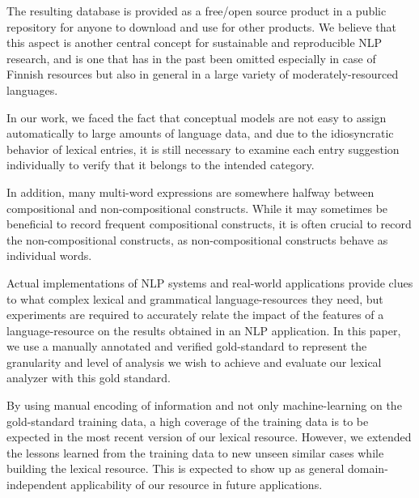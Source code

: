 \documentclass[11pt]{article}
\begin{document}
The resulting database is provided as a free/open source product in a public
repository for anyone to download and use for other products. We believe that
this aspect is another central concept for sustainable and reproducible NLP
research, and is one that has in the past been omitted especially in case of
Finnish resources but also in general in a large variety of
moderately-resourced languages.

In our work, we faced the fact that conceptual models are not easy to assign
automatically to large amounts of language data, and due to the idiosyncratic
behavior of lexical entries, it is still necessary to examine each entry
suggestion individually to verify that it belongs to the intended category.

In addition, many multi-word expressions are somewhere halfway between
compositional and non-compositional constructs.  While it may sometimes be
beneficial to record frequent compositional constructs, it is often crucial to
record the non-compositional constructs, as non-compositional constructs behave
as individual words. 

Actual implementations of NLP systems and real-world applications provide clues
to what complex lexical and grammatical language-resources they need, but
experiments are required to accurately relate the impact of the features of a
language-resource on the results obtained in an NLP application.  In this
paper, we use a manually annotated and verified gold-standard to represent the
granularity and level of analysis we wish to achieve and evaluate our lexical
analyzer with this gold standard. 

By using manual encoding of information and not only machine-learning on the
gold-standard training data, a high coverage of the training data is to be
expected in the most recent version of our lexical resource. However, we
extended the lessons learned from the training data to new unseen similar cases
while building the lexical resource.  This is expected to show up as general
domain-independent applicability of our resource in future applications.

\end{document}
